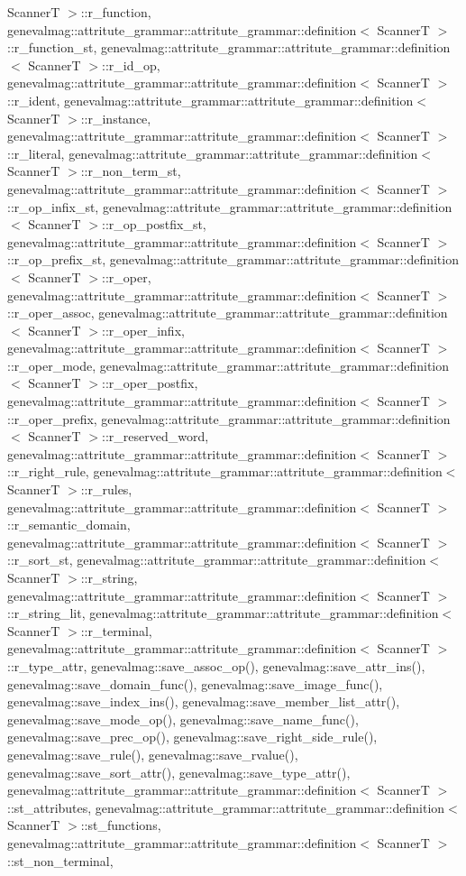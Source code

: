 ScannerT $>$::r\_\-function, genevalmag::attritute\_\-grammar::attritute\_\-grammar::definition$<$ ScannerT $>$::r\_\-function\_\-st, genevalmag::attritute\_\-grammar::attritute\_\-grammar::definition$<$ ScannerT $>$::r\_\-id\_\-op, genevalmag::attritute\_\-grammar::attritute\_\-grammar::definition$<$ ScannerT $>$::r\_\-ident, genevalmag::attritute\_\-grammar::attritute\_\-grammar::definition$<$ ScannerT $>$::r\_\-instance, genevalmag::attritute\_\-grammar::attritute\_\-grammar::definition$<$ ScannerT $>$::r\_\-literal, genevalmag::attritute\_\-grammar::attritute\_\-grammar::definition$<$ ScannerT $>$::r\_\-non\_\-term\_\-st, genevalmag::attritute\_\-grammar::attritute\_\-grammar::definition$<$ ScannerT $>$::r\_\-op\_\-infix\_\-st, genevalmag::attritute\_\-grammar::attritute\_\-grammar::definition$<$ ScannerT $>$::r\_\-op\_\-postfix\_\-st, genevalmag::attritute\_\-grammar::attritute\_\-grammar::definition$<$ ScannerT $>$::r\_\-op\_\-prefix\_\-st, genevalmag::attritute\_\-grammar::attritute\_\-grammar::definition$<$ ScannerT $>$::r\_\-oper, genevalmag::attritute\_\-grammar::attritute\_\-grammar::definition$<$ ScannerT $>$::r\_\-oper\_\-assoc, genevalmag::attritute\_\-grammar::attritute\_\-grammar::definition$<$ ScannerT $>$::r\_\-oper\_\-infix, genevalmag::attritute\_\-grammar::attritute\_\-grammar::definition$<$ ScannerT $>$::r\_\-oper\_\-mode, genevalmag::attritute\_\-grammar::attritute\_\-grammar::definition$<$ ScannerT $>$::r\_\-oper\_\-postfix, genevalmag::attritute\_\-grammar::attritute\_\-grammar::definition$<$ ScannerT $>$::r\_\-oper\_\-prefix, genevalmag::attritute\_\-grammar::attritute\_\-grammar::definition$<$ ScannerT $>$::r\_\-reserved\_\-word, genevalmag::attritute\_\-grammar::attritute\_\-grammar::definition$<$ ScannerT $>$::r\_\-right\_\-rule, genevalmag::attritute\_\-grammar::attritute\_\-grammar::definition$<$ ScannerT $>$::r\_\-rules, genevalmag::attritute\_\-grammar::attritute\_\-grammar::definition$<$ ScannerT $>$::r\_\-semantic\_\-domain, genevalmag::attritute\_\-grammar::attritute\_\-grammar::definition$<$ ScannerT $>$::r\_\-sort\_\-st, genevalmag::attritute\_\-grammar::attritute\_\-grammar::definition$<$ ScannerT $>$::r\_\-string, genevalmag::attritute\_\-grammar::attritute\_\-grammar::definition$<$ ScannerT $>$::r\_\-string\_\-lit, genevalmag::attritute\_\-grammar::attritute\_\-grammar::definition$<$ ScannerT $>$::r\_\-terminal, genevalmag::attritute\_\-grammar::attritute\_\-grammar::definition$<$ ScannerT $>$::r\_\-type\_\-attr, genevalmag::save\_\-assoc\_\-op(), genevalmag::save\_\-attr\_\-ins(), genevalmag::save\_\-domain\_\-func(), genevalmag::save\_\-image\_\-func(), genevalmag::save\_\-index\_\-ins(), genevalmag::save\_\-member\_\-list\_\-attr(), genevalmag::save\_\-mode\_\-op(), genevalmag::save\_\-name\_\-func(), genevalmag::save\_\-prec\_\-op(), genevalmag::save\_\-right\_\-side\_\-rule(), genevalmag::save\_\-rule(), genevalmag::save\_\-rvalue(), genevalmag::save\_\-sort\_\-attr(), genevalmag::save\_\-type\_\-attr(), genevalmag::attritute\_\-grammar::attritute\_\-grammar::definition$<$ ScannerT $>$::st\_\-attributes, genevalmag::attritute\_\-grammar::attritute\_\-grammar::definition$<$ ScannerT $>$::st\_\-functions, genevalmag::attritute\_\-grammar::attritute\_\-grammar::definition$<$ ScannerT $>$::st\_\-non\_\-terminal, 